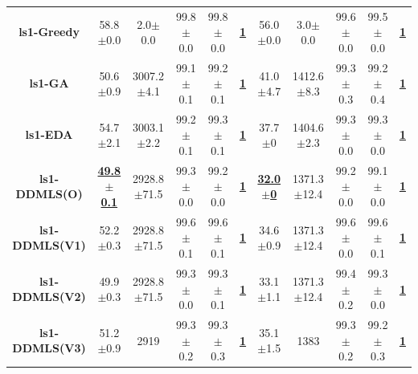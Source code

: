\documentclass[lettersize,journal]{IEEEtran}
\begin{document}
\begin{table}[!t]
{\begin{tabular}{ccccccccccc}
    \midrule
    {\bfseries ls1-Greedy} &58.8$\pm$0.0 &2.0$\pm$0.0 & 99.8$\pm$0.0 &99.8$\pm$0.0 &\underline{\bfseries 1} &56.0$\pm$0.0 &3.0$\pm$0.0& 99.6$\pm$0.0 &99.5$\pm$0.0 &\underline{\bfseries 1} \\
    {\bfseries ls1-GA} &50.6$\pm$0.9 &3007.2$\pm$4.1 & 99.1$\pm$0.1 &99.2$\pm$0.1 &\underline{\bfseries 1} &41.0$\pm$4.7 &1412.6$\pm$8.3& 99.3$\pm$0.3 &99.2$\pm$0.4 &\underline{\bfseries 1} \\
    {\bfseries ls1-EDA} &54.7$\pm$2.1 &3003.1$\pm$2.2 & 99.2$\pm$0.1 &99.3$\pm$0.1 &\underline{\bfseries 1} &37.7$\pm$0 &1404.6$\pm$2.3& 99.3$\pm$0.0 &99.3$\pm$0.0 &\underline{\bfseries 1} \\
    \bfseries ls1-DDMLS(O) &\underline{\bfseries 49.8$\pm$0.1} &2928.8$\pm$71.5 & 99.3$\pm$0.0 &99.2$\pm$0.0 &\underline{\bfseries 1} &\underline{\bfseries 32.0$\pm$0} &1371.3$\pm$12.4& 99.2$\pm$0.0 &99.1$\pm$0.0 &\underline{\bfseries 1} \\
    {\bfseries ls1-DDMLS(V1)} &52.2$\pm$0.3 &2928.8$\pm$71.5 & 99.6$\pm$0.1 &99.6$\pm$0.1 &\underline{\bfseries 1} &34.6$\pm$0.9 &1371.3$\pm$12.4& 99.6$\pm$0.0 &99.6$\pm$0.1 &\underline{\bfseries 1} \\
    {\bfseries ls1-DDMLS(V2)} &49.9$\pm$0.3 &2928.8$\pm$71.5 & 99.3$\pm$0.0 &99.3$\pm$0.1 &\underline{\bfseries 1} &33.1$\pm$1.1 &1371.3$\pm$12.4& 99.4$\pm$0.2 &99.3$\pm$0.0 &\underline{\bfseries 1} \\
    {\bfseries ls1-DDMLS(V3)} &51.2$\pm$0.9 &2919 & 99.3$\pm$0.2 &99.3$\pm$0.3 &\underline{\bfseries 1} &35.1$\pm$1.5 &1383& 99.3$\pm$0.2 &99.2$\pm$0.3 &\underline{\bfseries 1} \\
    

\end{tabular}}
\end{table}
\end{document}

